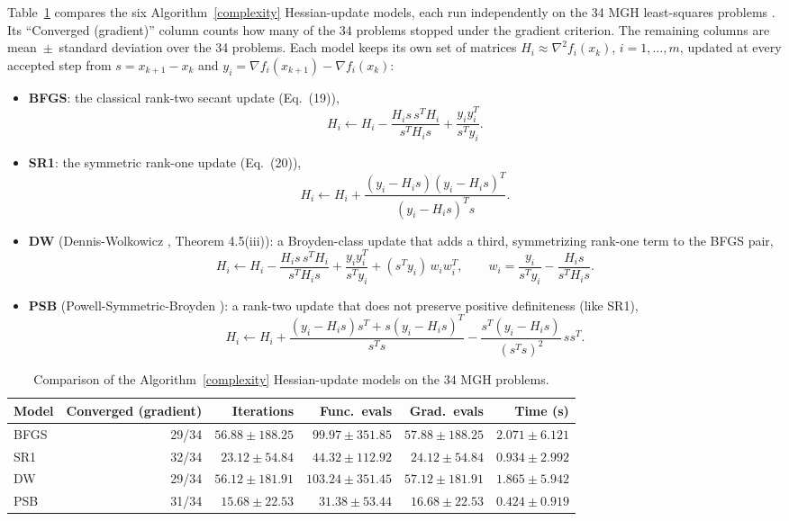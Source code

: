 \documentclass[11pt]{article}
\begin{document}
Table~\ref{tab:hessian-models} compares the six Algorithm~\ref{complexity} Hessian-update
models, each run independently on the 34 MGH least-squares problems
\cite{MoreGarbowHillstrom1981}. Its ``Converged (gradient)'' column counts
how many of the 34 problems stopped under the gradient criterion. The
remaining columns are mean~$\pm$~standard deviation over the 34 problems.
Each model keeps its own set of matrices $H_i \approx \nabla^2 f_i(x_k)$,
$i=1,\ldots,m$, updated at every accepted step from $s = x_{k+1}-x_k$ and
$y_i = \nabla f_i(x_{k+1}) - \nabla f_i(x_k)$:
\begin{itemize}
    \item \textbf{BFGS}: the classical rank-two secant update (Eq.~(19)),
    \[
        H_i \leftarrow H_i - \frac{H_i s\,s^T H_i}{s^T H_i s} + \frac{y_i y_i^T}{s^T y_i}.
    \]
    \item \textbf{SR1}: the symmetric rank-one update (Eq.~(20)),
    \[
        H_i \leftarrow H_i + \frac{(y_i - H_i s)(y_i - H_i s)^T}{(y_i - H_i s)^T s}.
    \]
    \item \textbf{DW} (Dennis-Wolkowicz \cite{DennisWolkowicz1993}, Theorem
    4.5(iii)): a Broyden-class update that adds a third, symmetrizing
    rank-one term to the BFGS pair,
    \[
        H_i \leftarrow H_i - \frac{H_i s\,s^T H_i}{s^T H_i s} + \frac{y_i y_i^T}{s^T y_i}
        + (s^T y_i)\, w_i w_i^T, \qquad
        w_i = \frac{y_i}{s^T y_i} - \frac{H_i s}{s^T H_i s}.
    \]
    \item \textbf{PSB} (Powell-Symmetric-Broyden \cite{Powell1970}): a
    rank-two update that does not preserve positive definiteness (like
    SR1),
    \[
        H_i \leftarrow H_i + \frac{(y_i - H_i s)s^T + s(y_i - H_i s)^T}{s^T s}
        - \frac{s^T(y_i - H_i s)}{(s^T s)^2}\, s s^T.
    \]
\end{itemize}

\begin{table}[htbp]
\centering
\caption{Comparison of the Algorithm~\ref{complexity} Hessian-update models on the 34 MGH problems.}
\label{tab:hessian-models}
\begin{tabular}{l r r r r r}
\toprule
Model & Converged (gradient) & Iterations & Func.\ evals & Grad.\ evals & Time (s) \\
\midrule
BFGS & 29/34 & $56.88 \pm 188.25$ & $99.97 \pm 351.85$ & $57.88 \pm 188.25$ & $2.071 \pm 6.121$ \\
SR1 & 32/34 & $23.12 \pm 54.84$ & $44.32 \pm 112.92$ & $24.12 \pm 54.84$ & $0.934 \pm 2.992$ \\
DW & 29/34 & $56.12 \pm 181.91$ & $103.24 \pm 351.45$ & $57.12 \pm 181.91$ & $1.865 \pm 5.942$ \\
PSB & 31/34 & $15.68 \pm 22.53$ & $31.38 \pm 53.44$ & $16.68 \pm 22.53$ & $0.424 \pm 0.919$ \\
\bottomrule
\end{tabular}
\end{table}
\end{document}
